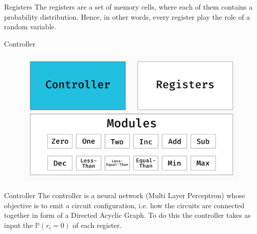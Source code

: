 \documentclass[xcolor={usenames}]{beamer}
\begin{document}
  \begin{frame}{Registers}
  	The registers are a set of memory cells, where each of them contains a probability distribution. Hence, in other words, every register play the role of a random variable.
  \end{frame}
  \begin{frame}{Controller}
  	\begin{figure}
  		\centering
  		\includegraphics[width=\textwidth]{../figures/schema-nram-without-memory-CL.png}
  	\end{figure}
  \end{frame}
  \begin{frame}{Controller}
  	The controller is a neural network (Multi Layer Perceptron) whose objective is to emit a circuit configuration, i.e. how the circuits are connected together in form of a Directed Acyclic Graph. To do this the controller takes as input the $\mathbb{P}(r_{i} = 0)$ of each register.
  \end{frame}
\end{document}
